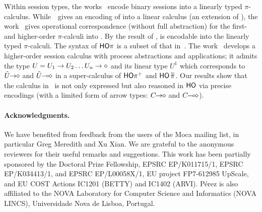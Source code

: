 \documentclass[runningheads]{llncs}
\begin{document}
{{Within session types, the works~\cite{DemangeonH11,Dardha:2012:STR:2370776.2370794} 
encode binary sessions into a linearly typed $\pi$-calculus. 
While~\cite{DemangeonH11}~gives an encoding of \sessp into a linear calculus 
(an extension of \cite{BHY}),  
the work~\cite{Dardha:2012:STR:2370776.2370794} 
gives  operational correspondence (without full abstraction)
for the first- and higher-order 
$\pi$-calculi into \cite{LinearPi}. 
By the result of \cite{DemangeonH11}, 
\HOpp is encodable  into the linearly typed $\pi$-calculi.     
The syntax of $\mathsf{HO}\pi$ is a subset of that in~\cite{tlca07,MostrousY15}.
The work~\cite{tlca07} develops a higher-order session calculus
with process abstractions and applications; it admits the type 
$U=U_1 \rightarrow U_2 \dots U_n \rightarrow \diamond$ and its linear type 
$U^1$
which corresponds to $\tilde{U}\!\! \rightarrow\!\! \diamond$ and $\tilde{U}\!\! \multimap\!\! \diamond$ in 
a super-calculus of $\mathsf{HO\pi^{+}}$ and $\mathsf{HO}\,{\widetilde{\pi}}$. 
Our results show that
the calculus in~\cite{tlca07} is not only expressed but 
also reasoned in 
$\mathsf{HO}$ via precise encodings (with a limited form of arrow types: $C\!\! \rightarrow\!\! \diamond$ and $C\!\! \multimap\!\! \diamond$). 

\paragraph{Acknowledgments.}
We have benefited from feedback from the users of the Moca mailing list, in particular Greg Meredith and Xu Xian.
We are grateful to the anonymous reviewers for their useful remarks and suggestions.
This work has been partially sponsored by the Doctoral Prize Fellowship, EPSRC EP/K011715/1, EPSRC EP/K034413/1, and EPSRC EP/L00058X/1, EU project FP7-612985 UpScale, and EU COST Actions IC1201 (BETTY) and IC1402 (ARVI). P\'{e}rez is also affiliated to the NOVA Laboratory for Computer Science and Informatics (NOVA LINCS), Universidade Nova de Lisboa, Portugal.
 
}}
\end{document}
